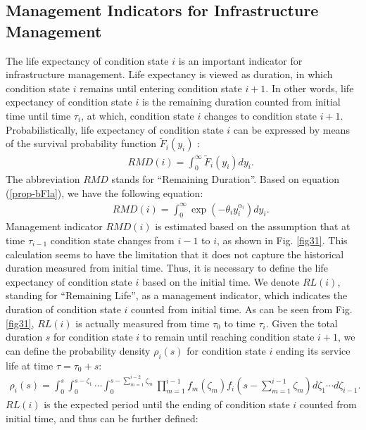 \subsection{Management Indicators for Infrastructure Management}
\label{334}
The life expectancy of condition state $i$ is an important indicator for infrastructure management. Life expectancy is viewed as duration, in which condition state $i$ remains until entering condition state $i+1$. In other words, life expectancy of condition state $i$ is the remaining duration counted from initial time until time $\tau_i$, at which, condition state $i$ changes to condition state $i+1$. Probabilistically, life expectancy of condition state $i$ can be expressed by means of the survival probability function $\tilde{F}_i(y_i)$ \cite{lancaster90}:
\begin{eqnarray}
&& RMD(i)= \int^{\infty}_{0}\tilde{F}_i(y_i)dy_i. \label{173}
\end{eqnarray}
The abbreviation $RMD$ stands for ``Remaining Duration''. Based on equation (\ref{prop-bFla}), we have the following equation:
\begin{eqnarray}
&& RMD(i)= \int^{\infty}_{0}\exp (-\theta_i y_i^{\alpha_i}) dy_i. \label{rating3}
\end{eqnarray}
Management indicator $RMD(i)$ is estimated based on the assumption that at time $\tau_{i-1}$ condition state changes from $i-1$ to $i$, as shown in Fig. \ref{fig31}. This calculation seems to have the  limitation that it does not capture the historical duration measured from initial time. Thus, it is necessary to define the life expectancy of condition state $i$ based on the initial time. We denote $RL(i)$, standing for ``Remaining Life'', as a management indicator, which indicates the duration of condition state $i$ counted from initial time. As can be seen from Fig. \ref{fig31}, $RL(i)$ is actually measured from time $\tau_0$ to time $\tau_i$. Given the total duration $s$ for condition state $i$ to  remain until reaching condition state $i+1$, we can define the probability density $\rho_{i}(s)$ for condition state $i$ ending its service life at time $\tau=\tau_0+s$:
\vspace{1mm}
\begin{eqnarray}
\rho_{i}(s)= \int_0^s \int_0^{s-\zeta_1} \cdots \int_{0}^{s-\sum_{m=1}^{i-2} \zeta_m} 
 \prod_{m=1}^{i-1} f_{m}(\zeta_m) f_i(s-\sum_{m=1}^{i-1} \zeta_m)d\zeta_1\cdots d\zeta_{i-1}.
\end{eqnarray}
$RL(i)$ is the expected period until the ending of condition state $i$ counted from initial time, and thus can be further defined:
